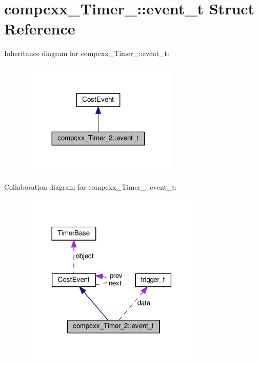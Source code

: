 \hypertarget{structcompcxx__Timer__2_1_1event__t}{}\section{compcxx\+\_\+\+Timer\+\_\+:\+:event\+\_\+t Struct Reference}
\label{structcompcxx__Timer__2_1_1event__t}


Inheritance diagram for compcxx\+\_\+\+Timer\+\_\+:\+:event\+\_\+t\+:\nopagebreak
\begin{figure}[H]
\begin{center}
\leavevmode
\includegraphics[width=215pt]{structcompcxx__Timer__2_1_1event__t__inherit__graph}
\end{center}
\end{figure}


Collaboration diagram for compcxx\+\_\+\+Timer\+\_\+:\+:event\+\_\+t\+:\nopagebreak
\begin{figure}[H]
\begin{center}
\leavevmode
\includegraphics[width=254pt]{structcompcxx__Timer__2_1_1event__t__coll__graph}
\end{center}
\end{figure}
